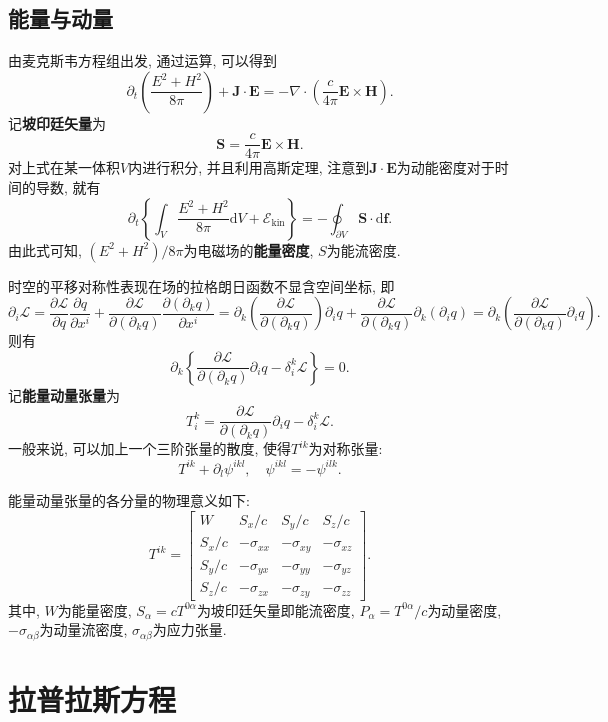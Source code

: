\documentclass{article}
\newcommand\del{\partial}
\newcommand\bo[1]{\boldsymbol{#1}}
\renewcommand\d{\mathrm{d}}
\begin{document}
\subsection{能量与动量}
由麦克斯韦方程组出发, 通过运算, 可以得到
\[\del_t\left(\frac{E^2+H^2 }{8\pi}\right)+\bo{J}\cdot\bo{E}=-\nabla\cdot(\frac{c}{4\pi}\bo{E}\times\bo{H}).\]
记\textbf{坡印廷矢量}为
\[\bo{S}=\frac{c}{4\pi}\bo{E}\times\bo{H}.\]
对上式在某一体积$V$内进行积分, 并且利用高斯定理, 注意到$\bo{J}\cdot\bo{E}$为动能密度对于时间的导数, 就有
\[\del_t\left\{\int_{V}\frac{E^2+H^2}{8\pi}\d V+\mathcal{E}_{\mathrm{kin}}\right\}=-\oint_{\del V}\bo{S}\cdot\d\bo{f}.\]
由此式可知, $\left(E^2+H^2\right)/8\pi$为电磁场的\textbf{能量密度}, $S$为能流密度.\par
时空的平移对称性表现在场的拉格朗日函数不显含空间坐标, 即
\[\del_i\mathcal{L}=\frac{\del\mathcal{L}}{\del q}\frac{\del q}{\del x^i}+\frac{\del\mathcal{L}}{\del(\del_kq)}\frac{\del(\del_kq)}{\del x^i}=\del_k\left(\frac{\del\mathcal{L}}{\del(\del_kq)}\right)\del_iq+\frac{\del\mathcal{L}}{\del(\del_kq)}\del_k(\del_iq)=\del_k\left(\frac{\del\mathcal{L}}{\del(\del_kq)}\del_iq\right).\]
则有
\[\del_k\left\{\frac{\del\mathcal{L}}{\del(\del_kq)}\del_iq-\delta_i^k\mathcal{L}\right\}=0.\]
记\textbf{能量动量张量}为
\[T_i^k=\frac{\del\mathcal{L}}{\del(\del_kq)}\del_iq-\delta_i^k\mathcal{L}.\]
一般来说, 可以加上一个三阶张量的散度, 使得$T^{ik}$为对称张量:
\[T^{ik}+\del_l\psi^{ikl},\quad\psi^{ikl}=-\psi^{ilk}.\]\par 
能量动量张量的各分量的物理意义如下:
\[T^{ik}=\begin{bmatrix}W&S_x/c&S_y/c&S_z/c\\S_x/c&-\sigma_{xx}&-\sigma_{xy}&-\sigma_{xz}\\S_y/c&-\sigma_{yx}&-\sigma_{yy}&-\sigma_{yz}\\S_z/c&-\sigma_{zx}&-\sigma_{zy}&-\sigma_{zz}\end{bmatrix}.\]
其中, $W$为能量密度, $S_\alpha=cT^{0\alpha}$为坡印廷矢量即能流密度, $P_\alpha=T^{0\alpha}/c$为动量密度, $-\sigma_{\alpha\beta}$为动量流密度, $\sigma_{\alpha\beta}$为应力张量.

\section{拉普拉斯方程}
\end{document}
